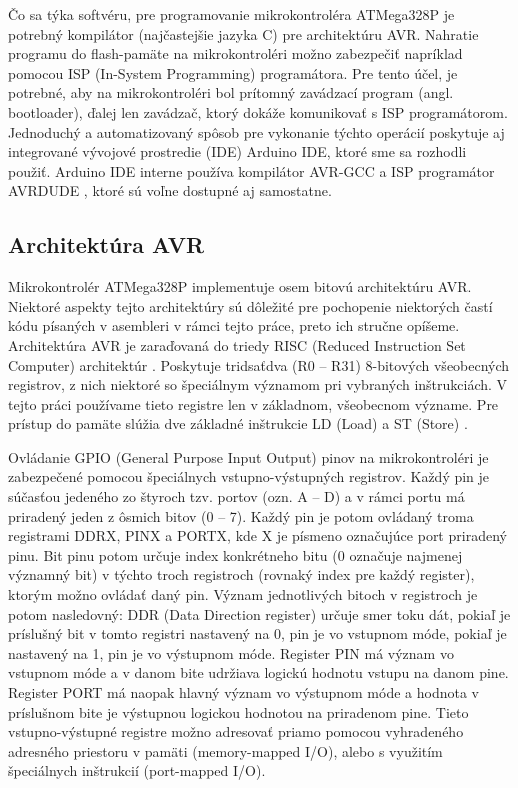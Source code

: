 Čo sa týka softvéru, pre programovanie mikrokontroléra ATMega328P je potrebný kompilátor (najčastejšie jazyka C) pre architektúru AVR. Nahratie programu do flash-pamäte na mikrokontroléri možno zabezpečiť napríklad pomocou ISP (In-System Programming) programátora. Pre tento účel, je potrebné, aby na mikrokontroléri bol prítomný zavádzací program (angl. bootloader), ďalej len zavádzač, ktorý dokáže komunikovať s ISP programátorom. Jednoduchý a automatizovaný spôsob pre vykonanie týchto operácií poskytuje aj integrované vývojové prostredie (IDE) Arduino IDE, ktoré sme sa rozhodli použiť. Arduino IDE interne používa kompilátor AVR-GCC a ISP programátor AVRDUDE \cite{avrdude}, ktoré sú voľne dostupné aj samostatne.

\subsection{Architektúra AVR}
Mikrokontrolér ATMega328P implementuje osem bitovú architektúru AVR. Niektoré aspekty tejto architektúry sú dôležité pre pochopenie niektorých častí kódu písaných v asembleri v rámci tejto práce, preto ich stručne opíšeme. Architektúra AVR je zaraďovaná do triedy RISC (Reduced Instruction Set Computer) architektúr \cite{avrInstruction}. Poskytuje tridsaťdva (R0 -- R31) 8-bitových všeobecných registrov, z nich niektoré so špeciálnym významom pri vybraných inštrukciách. V tejto práci používame tieto registre len v základnom, všeobecnom význame. Pre prístup do pamäte slúžia dve základné inštrukcie LD (Load) a ST (Store) \cite{avrInstruction}. 

Ovládanie GPIO (General Purpose Input Output) pinov na mikrokontroléri je zabezpečené pomocou špeciálnych vstupno-výstupných registrov. Každý pin je súčasťou jedeného zo štyroch tzv. portov (ozn. A -- D) a v rámci portu má priradený jeden z ôsmich bitov (0 -- 7). Každý pin je potom ovládaný troma registrami DDRX, PINX a PORTX, kde X je písmeno označujúce port priradený pinu. Bit pinu potom určuje index konkrétneho bitu (0 označuje najmenej významný bit) v týchto troch registroch (rovnaký index pre každý register), ktorým možno ovládať daný pin. Význam jednotlivých bitoch v registroch je potom nasledovný: DDR (Data Direction register) určuje smer toku dát, pokiaľ je príslušný bit v tomto registri nastavený na 0, pin je vo vstupnom móde, pokiaľ je nastavený na 1, pin je vo výstupnom móde. Register PIN má význam vo vstupnom móde a v danom bite udržiava logickú hodnotu vstupu na danom pine. Register PORT má naopak hlavný význam vo výstupnom móde a hodnota v príslušnom bite je výstupnou logickou hodnotou na priradenom pine. Tieto vstupno-výstupné registre možno adresovať priamo pomocou vyhradeného adresného priestoru v pamäti (memory-mapped I/O), alebo s využitím špeciálnych inštrukcií (port-mapped I/O).

